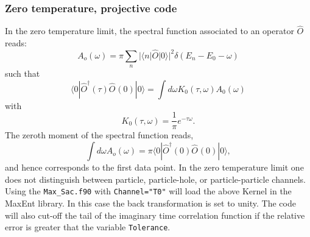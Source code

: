 \subsubsection{Zero temperature, projective code}

 In the zero temperature limit,  the spectral function associated to an operator $\hat{O} $    reads:
 \begin{equation}
 	  A_o(\omega)    = \pi  \sum_{n}    | \langle n  | \hat{O} | 0 \rangle |^2 \delta( E_n - E_0 - \omega) 
 \end{equation}
 such that 
 \begin{equation}
 	\langle 0 | \hat{O}^{\dagger}(\tau) \hat{O}^{}(0) | 0 \rangle =  \int d  \omega  K_0(\tau,\omega) A_0(\omega) 
 \end{equation}
 with 
 \begin{equation}
 	K_0(\tau,\omega)  = \frac{1}{\pi}e^{-\tau \omega}.
 \end{equation}
 The zeroth moment of the spectral function reads, 
 \begin{equation}
  \int d \omega A_o(\omega) = \pi \langle 0 | \hat{O}^{\dagger}(0) \hat{O}^{}(0) | 0 \rangle, 
 \end{equation}
 and hence corresponds to the first data point. 
 In the zero temperature limit one does not distinguish between  particle, particle-hole, or particle-particle channels.
 Using the \texttt{Max\_Sac.f90}  with \texttt{Channel="T0"}   will  load the above Kernel in the MaxEnt library. In this case the back  transformation is set to unity. 
 The code will also cut-off the tail of the  imaginary time correlation function  if the relative error is greater that the variable \texttt{Tolerance}. 
